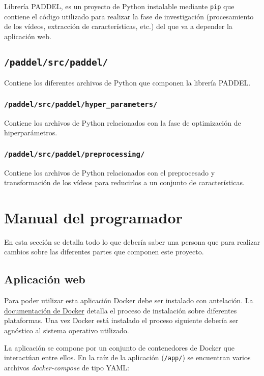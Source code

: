 Librería PADDEL, es un proyecto de Python instalable mediante \texttt{pip} que
contiene el código utilizado para realizar la fase de investigación
(procesamiento de los vídeos, extracción de características, etc.) del que va a
depender la aplicación web.

\subsection{\texttt{/paddel/src/paddel/}}

Contiene los diferentes archivos de Python que componen la librería PADDEL.

\subsubsection{\texttt{/paddel/src/paddel/hyper\_parameters/}}

Contiene los archivos de Python relacionados con la fase de optimización de
hiperparámetros.

\subsubsection{\texttt{/paddel/src/paddel/preprocessing/}}

Contiene los archivos de Python relacionados con el preprocesado y
transformación de los vídeos para reducirlos a un conjunto de características.

\section{Manual del programador}

En esta sección se detalla todo lo que debería saber una persona que para
realizar cambios sobre las diferentes partes que componen este proyecto.

\subsection{Aplicación web}

Para poder utilizar esta aplicación Docker debe ser instalado con antelación. La
\href{https://docs.docker.com/engine/install/}{documentación de Docker} detalla
el proceso de instalación sobre diferentes plataformas. Una vez Docker está
instalado el proceso siguiente debería ser agnóstico al sistema operativo
utilizado.

La aplicación se compone por un conjunto de contenedores de Docker que
interactúan entre ellos. En la raíz de la aplicación (\texttt{/app/}) se
encuentran varios archivos \textit{docker-compose} de tipo YAML:

